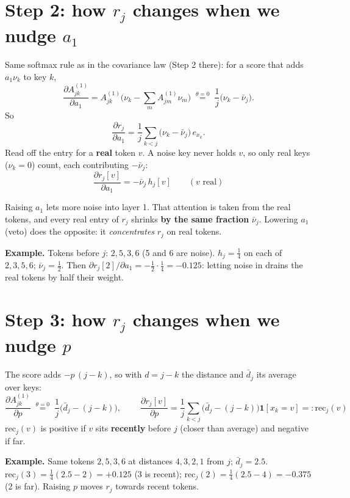 \documentclass[11pt]{article}
\newcommand{\1}{\mathbf{1}}
\begin{document}
\section{Step 2: how $r_j$ changes when we nudge $a_1$}
Same softmax rule as in the covariance law (Step 2 there): for a score that adds $a_1\nu_k$ to key $k$,
\[
\frac{\partial A^{(1)}_{jk}}{\partial a_1}=A^{(1)}_{jk}\Big(\nu_k-\sum_mA^{(1)}_{jm}\nu_m\Big)
\;\overset{\theta=0}{=}\;\frac1j\big(\nu_k-\bar\nu_j\big).
\]
So
\[
\frac{\partial r_j}{\partial a_1}=\frac1j\sum_{k<j}\big(\nu_k-\bar\nu_j\big)\,e_{x_k}.
\]
Read off the entry for a \textbf{real} token $v$. A noise key never holds $v$, so only real keys ($\nu_k=0$)
count, each contributing $-\bar\nu_j$:
\[
\boxed{\ \frac{\partial r_j[v]}{\partial a_1}=-\bar\nu_j\,h_j[v]\qquad(v\text{ real})\ }
\]
\begin{idea}
Raising $a_1$ lets more noise into layer 1. That attention is taken from the real tokens, and every real entry
of $r_j$ shrinks \textbf{by the same fraction} $\bar\nu_j$. Lowering $a_1$ (veto) does the opposite: it
\emph{concentrates} $r_j$ on real tokens.
\end{idea}
\textbf{Example.} Tokens before $j$: $2,5,3,6$ (5 and 6 are noise). $h_j=\tfrac14$ on each of $2,3,5,6$; $\bar\nu_j=\tfrac12$.
Then $\partial r_j[2]/\partial a_1=-\tfrac12\cdot\tfrac14=-0.125$: letting noise in drains the real tokens by half their weight.

\section{Step 3: how $r_j$ changes when we nudge $p$}
The score adds $-p\,(j-k)$, so with $d=j-k$ the distance and $\bar d_j$ its average over keys:
\[
\frac{\partial A^{(1)}_{jk}}{\partial p}\;\overset{\theta=0}{=}\;\frac1j\big(\bar d_j-(j-k)\big),
\qquad
\boxed{\ \frac{\partial r_j[v]}{\partial p}=\frac1j\sum_{k<j}\big(\bar d_j-(j-k)\big)\1[x_k=v]=:\mathrm{rec}_j(v)\ }
\]
$\mathrm{rec}_j(v)$ is positive if $v$ sits \textbf{recently} before $j$ (closer than average) and negative if far.

\textbf{Example.} Same tokens $2,5,3,6$ at distances $4,3,2,1$ from $j$; $\bar d_j=2.5$.
$\mathrm{rec}_j(3)=\tfrac14(2.5-2)=+0.125$ (3 is recent); $\mathrm{rec}_j(2)=\tfrac14(2.5-4)=-0.375$ (2 is far).
Raising $p$ moves $r_j$ towards recent tokens.
\end{document}
